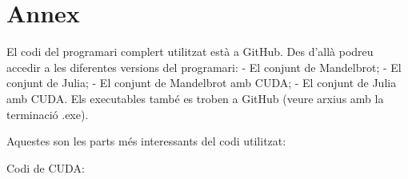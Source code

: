 \appendix
\section{Annex}

El codi del programari complert utilitzat està a GitHub. Des d'allà podreu accedir a les diferentes versions del programari: \n
   - El conjunt de Mandelbrot;\n
   - El conjunt de Julia;\n
   - El conjunt de Mandelbrot amb CUDA;\n
   - El conjunt de Julia amb CUDA.\n
Els executables també es troben a GitHub (veure arxius amb la terminació .exe). \n


\noindent Aquestes son les parts més interessants del codi utilitzat:
\label{app:CUDA}

\noindent Codi de CUDA: \n

